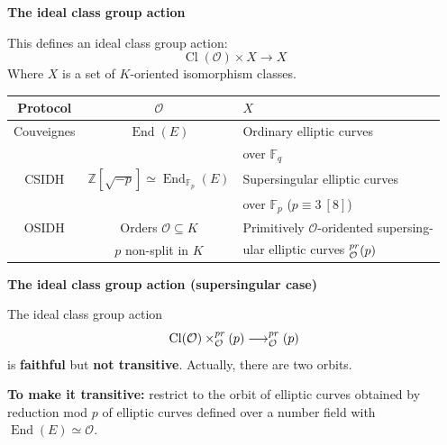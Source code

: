 \documentclass[10pt]{beamer}
\theoremstyle{plain}
\theoremstyle{definition}
\newcommand{\Z}{\mathbb{Z}}
\newcommand{\F}{\mathbb{F}}
\newcommand{\mO}{\mathcal{O}}
\renewcommand{\(}{\left(}
\renewcommand{\)}{\right)}
\DeclareMathOperator{\End}{End}
\DeclareMathOperator{\Cl}{Cl}
\let\SS\relax
\DeclareMathOperator{\SS}{SS}
\begin{document}
\begin{frame}

\textbf{The ideal class group action}

\vspace{0.5cm}

This defines an ideal class group action:
\[\Cl(\mO)\times X\longrightarrow X\]
Where $X$ is a set of $K$-oriented isomorphism classes.

\begin{center}
\begin{tabular}{c|c|l}
Protocol & $\mO$ & $X$ \\
 \hline
   \rule{0pt}{4ex}  
 Couveignes & $\End(E)$ & Ordinary elliptic curves \\
 & & over $\F_q$ \\
  \rule{0pt}{4ex}  
 CSIDH & $\Z[\sqrt{-p}]\simeq \End_{\F_p}(E)$ & Supersingular elliptic curves \\
 & & over $\F_p$ ($p\equiv 3 \ [8]$)\\
  \rule{0pt}{4ex}  
 OSIDH & Orders $\mO\subseteq K$ & Primitively $\mO$-oridented supersing-\\
 & $p$ non-split in $K$ & ular elliptic curves $\SS_{\mO}^{pr}(p)$
\end{tabular}
\end{center}

\end{frame}

\begin{frame}

\textbf{The ideal class group action (supersingular case)}

\vspace{0.5cm}

\begin{theorem}[Onuki]
The ideal class group action 
\[\Cl(\mO)\times\SS_{\mO}^{pr}(p)\longrightarrow \SS_{\mO}^{pr}(p)\] 
is \textbf{faithful} but \textbf{not transitive}. Actually, there are two orbits.
\end{theorem}

\vspace{0.5cm}

\pause

\textbf{To make it transitive:} restrict to the orbit of elliptic curves obtained by reduction mod $p$ of elliptic curves defined over a number field with $\End(E)\simeq\mO$. 

\end{frame}
\end{document}

